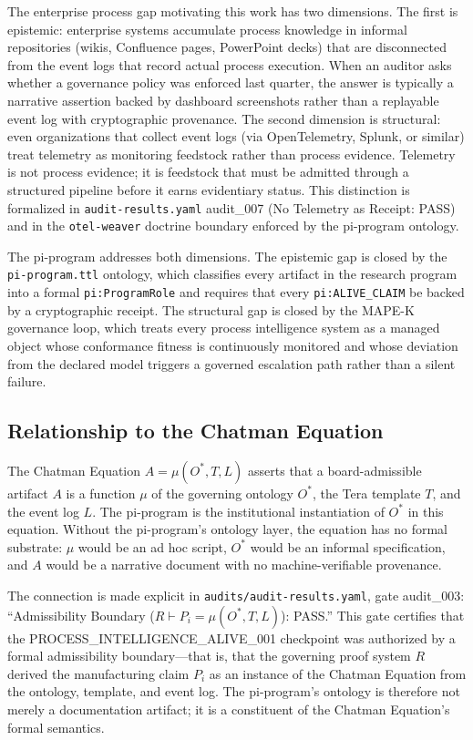 The enterprise process gap motivating this work has two dimensions. The first is epistemic: enterprise systems accumulate process knowledge in informal repositories (wikis, Confluence pages, PowerPoint decks) that are disconnected from the event logs that record actual process execution. When an auditor asks whether a governance policy was enforced last quarter, the answer is typically a narrative assertion backed by dashboard screenshots rather than a replayable event log with cryptographic provenance. The second dimension is structural: even organizations that collect event logs (via OpenTelemetry, Splunk, or similar) treat telemetry as monitoring feedstock rather than process evidence. Telemetry is not process evidence; it is feedstock that must be admitted through a structured pipeline before it earns evidentiary status. This distinction is formalized in \texttt{audit-results.yaml} audit\_007 (No Telemetry as Receipt: PASS) and in the \texttt{otel-weaver} doctrine boundary enforced by the pi-program ontology.

The pi-program addresses both dimensions. The epistemic gap is closed by the \texttt{pi-program.ttl} ontology, which classifies every artifact in the research program into a formal \texttt{pi:ProgramRole} and requires that every \texttt{pi:ALIVE\_CLAIM} be backed by a cryptographic receipt. The structural gap is closed by the MAPE-K governance loop, which treats every process intelligence system as a managed object whose conformance fitness is continuously monitored and whose deviation from the declared model triggers a governed escalation path rather than a silent failure.

\subsection{Relationship to the Chatman Equation}
\label{sec:research-pi-program-lineage-chatman-eq}

The Chatman Equation \( A = \mu(O^{*}, T, L) \) asserts that a board-admissible artifact $A$ is a function $\mu$ of the governing ontology $O^{*}$, the Tera template $T$, and the event log $L$. The pi-program is the institutional instantiation of $O^{*}$ in this equation. Without the pi-program's ontology layer, the equation has no formal substrate: $\mu$ would be an ad hoc script, $O^{*}$ would be an informal specification, and $A$ would be a narrative document with no machine-verifiable provenance.

The connection is made explicit in \texttt{audits/audit-results.yaml}, gate audit\_003: ``Admissibility Boundary ($R \vdash P_i = \mu(O^{*}, T, L)$): PASS.'' This gate certifies that the PROCESS\_INTELLIGENCE\_ALIVE\_001 checkpoint was authorized by a formal admissibility boundary---that is, that the governing proof system $R$ derived the manufacturing claim $P_i$ as an instance of the Chatman Equation from the ontology, template, and event log. The pi-program's ontology is therefore not merely a documentation artifact; it is a constituent of the Chatman Equation's formal semantics.

